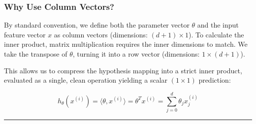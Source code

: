 \documentclass{article}
\begin{document}
\subsubsection*{Why Use Column Vectors?}

By standard convention, we define both the parameter vector $\theta$ and the input feature vector $x$ as column vectors (dimensions: $(d + 1) \times 1$). To calculate the inner product, matrix multiplication requires the inner dimensions to match. We take the transpose of $\theta$, turning it into a row vector (dimensions: $1 \times (d+1)$).

This allows us to compress the hypothesis mapping into a strict inner product, evaluated as a single, clean operation yielding a scalar $(1 \times 1)$ prediction:

\[ h_\theta(x^{(i)}) = \langle \theta, x^{(i)} \rangle = \theta^T x^{(i)} = \sum_{j=0}^{d} \theta_j x_j^{(i)} \]

\vspace{1em}
\noindent\rule{\textwidth}{0.4pt}
\end{document}
